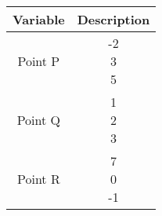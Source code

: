 \begin{tabular}{|c|c|}
	\hline
	Variable & Description\\
	\hline
	Point P & \myvec{-2\\3\\5}\\
	\hline
	Point Q & \myvec{1\\2\\3}\\
	\hline
	Point R & \myvec{7\\0\\-1}\\
	\hline
\end{tabular}
